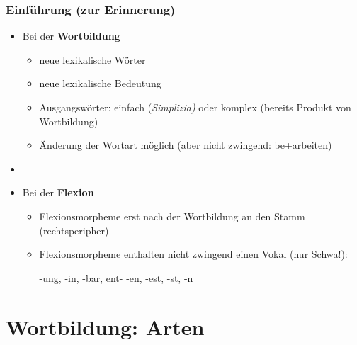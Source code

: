 \begin{frame}
\frametitle{Einführung (zur Erinnerung)}

\begin{itemize}
	\item Bei der \textbf{Wortbildung}
	
	\begin{itemize}
		\item neue lexikalische Wörter
		\item neue lexikalische Bedeutung
		\item Ausgangswörter: einfach (\emph{Simplizia)} oder komplex (bereits Produkt von Wortbildung)
		\item Änderung der Wortart möglich (aber nicht zwingend: be+arbeiten)
	\end{itemize}
	
	\item[]
	\item Bei der \textbf{Flexion}
	
	\begin{itemize}
		\item Flexionsmorpheme erst nach der Wortbildung an den Stamm (rechtsperipher)
		\item Flexionsmorpheme enthalten nicht zwingend einen Vokal (nur Schwa!):
		
		\ea -ung, -in, -bar, ent- \vs -en, -est, -st, -n
		\z
		
	\end{itemize}
\end{itemize}


\end{frame}


\section{Wortbildung: Arten}


